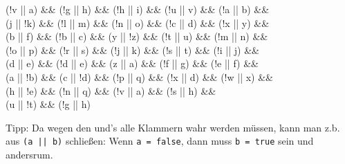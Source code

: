 \documentclass{../../sheet}
\begin{document}
\begin{enumerate}
\begin{enumerate}
\begin{ausgabe}
{            (!v || a) \&\&
            (!g || h) \&\&
            (!h || i) \&\&
            (!u || v) \&\&
            (!a || b) \&\&\\
            (j || !k) \&\&
            (!l || m) \&\&
            (!n || o) \&\&
            (!c || d) \&\&
            (!x || y) \&\&\\
            (b || f) \&\&
            (!b || c) \&\&
            (y || !z) \&\&
            (!t || u) \&\&
            (!m || n) \&\&\\
            (!o || p) \&\&
            (!r || s) \&\&
            (!j || k) \&\&
            (!s || t) \&\&
            (!i || j) \&\&\\
            (d || e) \&\&
            (!d || e) \&\&
            (z || a) \&\&
            (!f || g) \&\&
            (!e || f) \&\&\\
            (a || !b) \&\&
            (c || !d) \&\&
            (!p || q) \&\&
            (!x || d) \&\&
            (!w || x) \&\&\\
            (h || !e) \&\&
            (!n || q) \&\&
            (!v || a) \&\&
            (!s || h) \&\&\\
            (u || !t) \&\&
            (!g || h)} 
    \end{ausgabe} %
    Tipp: Da wegen den und's alle Klammern wahr werden müssen, kann man z.b. aus \texttt{(a || b)} schließen: Wenn \texttt{a = false}, dann muss \texttt{b = true} sein und andersrum.
    \end{enumerate}
\end{enumerate}
\end{document}
